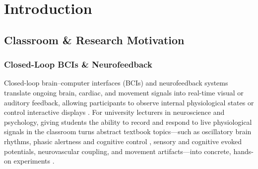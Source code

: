\documentclass[11pt]{article}
\begin{document}
\begin{abstract}
\noindent\textbf{Keywords:} electroencephalography (EEG); functional near-infrared spectroscopy (fNIRS); photoplethysmography (PPG); brain--computer interface (BCI); event-related potential (ERP); neuroscience and psychology education
\end{abstract}

\clearpage
\setcounter{tocdepth}{3}
\tableofcontents
\clearpage

\section{Introduction}

\subsection{Classroom \& Research Motivation}

\subsubsection{Closed-Loop BCIs \& Neurofeedback}
Closed-loop brain--computer interfaces (BCIs) and neurofeedback systems translate ongoing brain, cardiac, and movement signals into real-time visual or auditory feedback, allowing participants to observe internal physiological states or control interactive displays \citep{sitaram2017closed,enriquez2017eeg,lotte2013flaws}. For university lecturers in neuroscience and psychology, giving students the ability to record and respond to live physiological signals in the classroom turns abstract textbook topics---such as oscillatory brain rhythms, phasic alertness and cognitive control \citep{dekleijn2023short,dekleijn2025phasic}, sensory and cognitive evoked potentials, neurovascular coupling, and movement artifacts---into concrete, hands-on experiments \citep{mathewson2024moving,miranda2014brain,janssen2021opportunities}.
\end{document}
